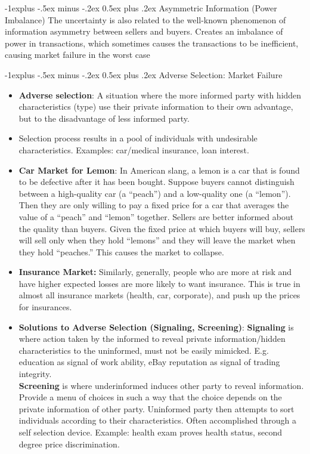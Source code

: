 \documentclass[12pt, landscape]{article}
\makeatletter
\renewcommand{\subsection}{\@startsection{subsection}{2}{0mm}%
                                {-1explus -.5ex minus -.2ex}%
                                {0.5ex plus .2ex}%
                                {\normalfont\normalsize\bfseries}}
\makeatother
\begin{document}
\begin{multicols*}{3}
\subsection{Asymmetric Information (Power Imbalance)}
The uncertainty is also related to the well-known phenomenon of information asymmetry between sellers and buyers. Creates an imbalance of power in transactions, which sometimes causes the transactions to be inefficient, causing market failure in the worst case

\subsection{Adverse Selection: Market Failure}
\begin{itemize}
\item \textbf{Adverse selection}: A situation where the more informed party with hidden characteristics (type) use their private information to their own advantage, but to the disadvantage of less informed party.
\item Selection process results in a pool of individuals with undesirable characteristics. Examples: car/medical insurance, loan interest.
\item \textbf{Car Market for Lemon}: In American slang, a lemon is a car that is found to be defective after it has been bought. Suppose buyers cannot distinguish between a high-quality car (a “peach”) and a low-quality one (a “lemon”). Then they are only willing to pay a fixed price for a car that averages the value of a “peach” and “lemon” together. Sellers are better informed about the quality than buyers. Given the fixed price at which buyers will buy, sellers will sell only when they hold “lemons” and they will leave the market when they hold “peaches.” This causes the market to collapse.
\item \textbf{Insurance Market:} Similarly, generally, people who are more at risk and have higher expected losses are more likely to want insurance. This is true in almost all insurance markets (health, car, corporate), and push up the prices for insurances.
\item \textbf{Solutions to Adverse Selection (Signaling, Screening)}: \textbf{Signaling} is where action taken by the informed to reveal private information/hidden characteristics to the uninformed, must not be easily mimicked. E.g. education as signal of work ability, eBay reputation as signal of trading integrity. \\ \textbf{Screening} is where underinformed induces other party to reveal information. Provide a menu of choices in such a way that the choice depends on the private information of other party. Uninformed party then attempts to sort individuals according to their characteristics. Often accomplished through a self selection device. Example: health exam proves health status, second degree price discrimination.

\end{itemize}
\end{multicols*}
\end{document}
